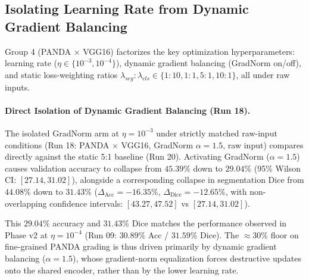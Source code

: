 \documentclass[runningheads]{llncs}
\begin{document}
\subsection{Isolating Learning Rate from Dynamic Gradient Balancing}\label{sec:gn}
Group 4 (PANDA $\times$ VGG16) factorizes the key optimization hyperparameters: learning rate ($\eta \in \{10^{-3}, 10^{-4}\}$), dynamic gradient balancing (GradNorm on/off), and static loss-weighting ratios $\lambda_{seg}:\lambda_{cls} \in \{1{:}10, 1{:}1, 5{:}1, 10{:}1\}$, all under raw inputs.

\paragraph{Direct Isolation of Dynamic Gradient Balancing (Run 18).}
The isolated GradNorm arm at $\eta=10^{-3}$ under strictly matched raw-input conditions (Run 18: PANDA $\times$ VGG16, GradNorm $\alpha=1.5$, raw input) compares directly against the static 5:1 baseline (Run 20). Activating GradNorm ($\alpha=1.5$) causes validation accuracy to collapse from $45.39\%$ down to $29.04\%$ (95\% Wilson CI: $[27.14, 31.02]$), alongside a corresponding collapse in segmentation Dice from $44.08\%$ down to $31.43\%$ ($\Delta_{\text{Acc}} = -16.35\%$, $\Delta_{\text{Dice}} = -12.65\%$, with non-overlapping confidence intervals: $[43.27, 47.52]$ vs $[27.14, 31.02]$).

This $29.04\%$ accuracy and $31.43\%$ Dice matches the performance observed in Phase v2 at $\eta=10^{-4}$ (Run 09: $30.89\%$ Acc / $31.59\%$ Dice). The $\approx 30\%$ floor on fine-grained PANDA grading is thus driven primarily by dynamic gradient balancing ($\alpha=1.5$), whose gradient-norm equalization forces destructive updates onto the shared encoder, rather than by the lower learning rate.
\end{document}
